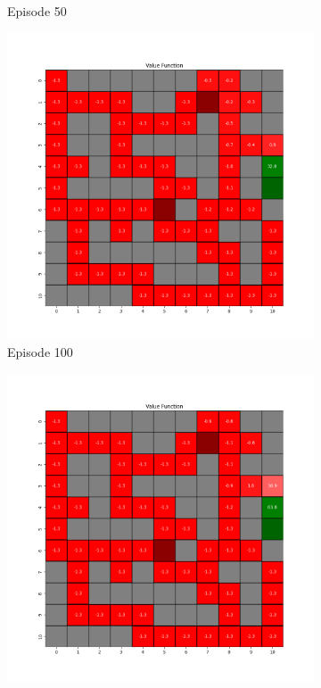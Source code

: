 \documentclass{assignment}
\begin{document}
\begin{figure}[H]
\begin{subfigure}{0.3\textwidth}
    \caption{Episode 50}
    \end{subfigure}\hfill
    \begin{subfigure}{0.3\textwidth}
        \includegraphics[width=\textwidth]{figures/value_q/gamma_sweep/value_function_alpha_0.1_gamma_0.25_epsilon_0.2_iteration_100.png}
    \caption{Episode 100}
    \end{subfigure}
    \begin{subfigure}{0.3\textwidth}
        \includegraphics[width=\textwidth]{figures/value_q/gamma_sweep/value_function_alpha_0.1_gamma_0.25_epsilon_0.2_iteration_1000.png}

\end{subfigure}
\end{figure}
\end{document}
